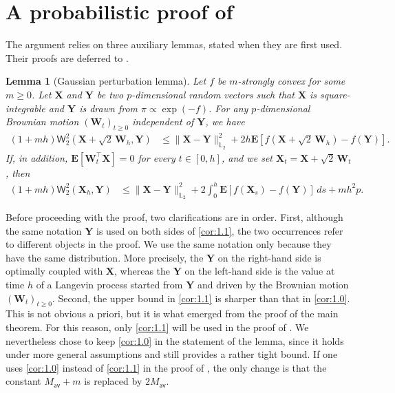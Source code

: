 \documentclass[aos,reqno]{imsart}
\newcommand\bY{\boldsymbol Y}
\newcommand\bX{\boldsymbol X}
\newcommand\bW{\boldsymbol W}
\def\wass{\mathsf{W}}
\def\Mav{M_{\textsf{av}}}
\newtheorem{lemma}{Lemma}
\theoremstyle{definition}
\begin{document}
\section{A probabilistic proof of }
\label{Sec:proof}

The argument relies on three auxiliary lemmas, stated when 
they are first used. Their proofs are deferred to 
.
\begin{lemma}[Gaussian perturbation lemma]\label{lem:2}
    Let $f$ be $m$-strongly convex for some $m\geqslant 
    0$. Let $\bX$ and $\bY$ be two $p$-dimensional random 
    vectors such that $\bX$ is square-integrable and 
    $\bY$ is drawn from $\pi\propto \exp(-f)$. For any
    $p$-dimensional Brownian motion $(\bW_t)_{t\ge 0}$
    independent of\/ $\bY$, we have 
    \begin{align}
        (1+mh)\wass_2^2(\bX+\sqrt{2}\,\bW_h, \bY) &\leqslant
        \|\bX - \bY\|^2_{\mathbb L_2} + 2h
        \mathbf{E} [f(\bX+\sqrt{2}\,\bW_h) - f(\bY)] 
        \label{cor:1.0}.
    \end{align} 
    If, in addition,  $\mathbf E[\bW_t^\top \bX] = 0$ for 
    every $t\in [0,h]$,  and we set $\bX_t = \bX+\sqrt{2}\,
    \bW_t$, then 
    \begin{align}
        (1+mh)\wass_2^2(\bX_h, \bY) &\leqslant
        \|\bX - \bY\|^2_{\mathbb L_2} + 2\int_0^h 
        \mathbf{E} [f(\bX_s) - f(\bY)]\,ds + mh^2p\label{cor:1.1}.
    \end{align} 
\end{lemma}

Before proceeding with the proof, two clarifications are
in order. First, although the same notation $\bY$ is 
used on both sides of \eqref{cor:1.1}, the two 
occurrences refer to different objects in the proof. We
use the same notation only because they have the same
distribution. More precisely, the $\bY$ on the
right-hand side is optimally coupled with $\bX$,
whereas the $\bY$ on the left-hand side is the value at
time $h$ of a Langevin process started from $\bY$ and
driven by the Brownian motion $(\bW_t)_{t\geqslant 0}$.
Second, the upper bound in \eqref{cor:1.1} is sharper
than that in \eqref{cor:1.0}. This is not obvious a
priori, but it is what emerged from the proof of the
main theorem. For this reason, only \eqref{cor:1.1}
will be used in the proof of . We
nevertheless chose to keep \eqref{cor:1.0} in the
statement of the lemma, since it holds under more
general assumptions and still provides a rather tight
bound. If one uses \eqref{cor:1.0} instead of
\eqref{cor:1.1} in the proof of , the only
change is that the constant $\Mav + m$ is replaced by
$2\Mav$.
\end{document}
